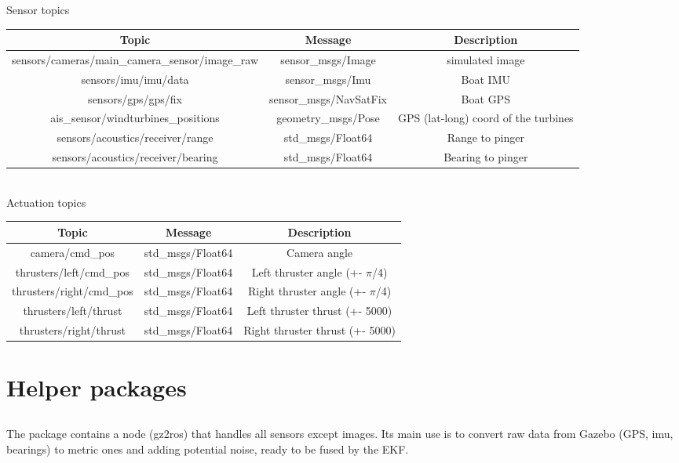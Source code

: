 \documentclass{ecnreport}
\begin{document}
\begin{center}\footnotesize
Sensor topics\\

 \begin{tabular}{c|c|c}
Topic &Message& Description \\\hline
sensors/cameras/main\_camera\_sensor/image\_raw& sensor\_msgs/Image &simulated image \\
sensors/imu/imu/data& sensor\_msgs/Imu &Boat IMU\\
sensors/gps/gps/fix& sensor\_msgs/NavSatFix &Boat GPS\\
ais\_sensor/windturbines\_positions& geometry\_msgs/Pose &GPS (lat-long) coord of the turbines\\
sensors/acoustics/receiver/range &std\_msgs/Float64& Range to pinger\\
sensors/acoustics/receiver/bearing& std\_msgs/Float64& Bearing to pinger
 \end{tabular}~\\
 \vspace{1cm}
 Actuation topics\\
 \begin{tabular}{c|c|c}
  Topic &Message& Description\\\hline
  camera/cmd\_pos &std\_msgs/Float64& Camera angle\\
  thrusters/left/cmd\_pos& std\_msgs/Float64 &Left thruster angle (+- $\pi$/4)\\
  thrusters/right/cmd\_pos &std\_msgs/Float64& Right thruster angle (+- $\pi$/4)\\
  thrusters/left/thrust &std\_msgs/Float64 &Left thruster thrust (+- 5000)\\
  thrusters/right/thrust &std\_msgs/Float64 &Right thruster thrust (+- 5000)
 \end{tabular}
\end{center}

\section{Helper packages}

\subsection{}

The  package contains a node (gz2ros) that handles all sensors except images. Its main use is to convert raw data from Gazebo (GPS, imu, bearings) to metric ones and adding potential noise, ready to be fused by the EKF.
\end{document}
